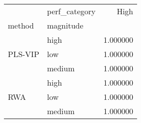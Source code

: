 \begin{tabular}{llr}
\toprule
 & perf_category & High \\
method & magnitude &  \\
\midrule
\multirow[t]{3}{*}{PLS-VIP} & high & 1.000000 \\
 & low & 1.000000 \\
 & medium & 1.000000 \\
\cline{1-3}
\multirow[t]{3}{*}{RWA} & high & 1.000000 \\
 & low & 1.000000 \\
 & medium & 1.000000 \\
\cline{1-3}
\bottomrule
\end{tabular}
